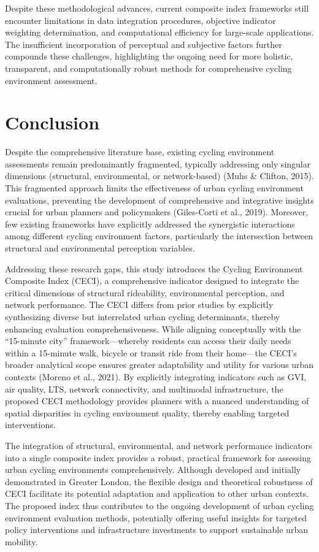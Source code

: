 \documentclass[
  12pt,
  oneside]{book}
\begin{document}
Despite these methodological advances, current composite index frameworks still encounter limitations in data integration procedures, objective indicator weighting determination, and computational efficiency for large-scale applications. The insufficient incorporation of perceptual and subjective factors further compounds these challenges, highlighting the ongoing need for more holistic, transparent, and computationally robust methods for comprehensive cycling environment assessment.

\section{Conclusion}\label{conclusion}

Despite the comprehensive literature base, existing cycling environment assessments remain predominantly fragmented, typically addressing only singular dimensions (structural, environmental, or network-based) (Muhs \& Clifton, 2015). This fragmented approach limits the effectiveness of urban cycling environment evaluations, preventing the development of comprehensive and integrative insights crucial for urban planners and policymakers (Giles-Corti et al., 2019). Moreover, few existing frameworks have explicitly addressed the synergistic interactions among different cycling environment factors, particularly the intersection between structural and environmental perception variables.

Addressing these research gaps, this study introduces the Cycling Environment Composite Index (CECI), a comprehensive indicator designed to integrate the critical dimensions of structural rideability, environmental perception, and network performance. The CECI differs from prior studies by explicitly synthesizing diverse but interrelated urban cycling determinants, thereby enhancing evaluation comprehensiveness. While aligning conceptually with the ``15-minute city'' framework---whereby residents can access their daily needs within a 15-minute walk, bicycle or transit ride from their home---the CECI's broader analytical scope ensures greater adaptability and utility for various urban contexts (Moreno et al., 2021). By explicitly integrating indicators such as GVI, air quality, LTS, network connectivity, and multimodal infrastructure, the proposed CECI methodology provides planners with a nuanced understanding of spatial disparities in cycling environment quality, thereby enabling targeted interventions.

The integration of structural, environmental, and network performance indicators into a single composite index provides a robust, practical framework for assessing urban cycling environments comprehensively. Although developed and initially demonstrated in Greater London, the flexible design and theoretical robustness of CECI facilitate its potential adaptation and application to other urban contexts. The proposed index thus contributes to the ongoing development of urban cycling environment evaluation methods, potentially offering useful insights for targeted policy interventions and infrastructure investments to support sustainable urban mobility.
\end{document}

